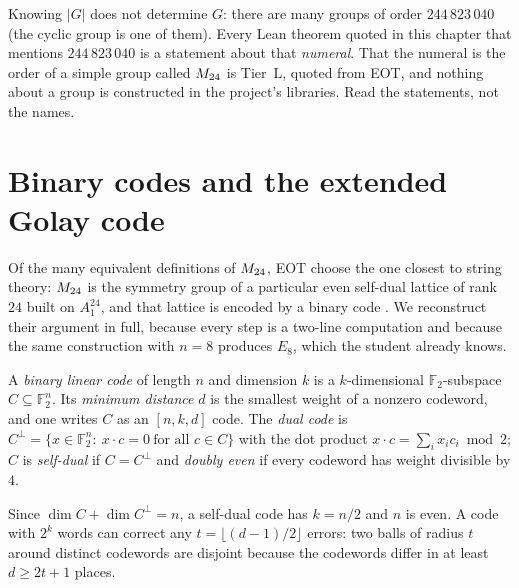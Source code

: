 \begin{pitfallbox}
Knowing $|G|$ does not determine $G$: there are many groups of order $244\,823\,040$ (the
cyclic group is one of them). Every Lean theorem quoted in this chapter that mentions
$244\,823\,040$ is a statement about that \emph{numeral}. That the numeral is the order of a
simple group called $M_{24}$ is Tier~L, quoted from EOT, and nothing about a group is
constructed in the project's libraries. Read the statements, not the names.
\end{pitfallbox}

\section{Binary codes and the extended Golay code}\label{sec:m24:golay}

Of the many equivalent definitions of $M_{24}$, EOT choose the one closest to string theory:
$M_{24}$ is the symmetry group of a particular even self-dual lattice of rank $24$ built on
$A_1^{24}$, and that lattice is encoded by a binary code .
We reconstruct their argument in full, because every step is a two-line computation and
because the same construction with $n=8$ produces $E_8$, which the student already knows.

\begin{definition}\label{def:m24:code}
A \emph{binary linear code} of length $n$ and dimension $k$ is a
$k$-dimensional $\mathbb F_2$-subspace $C\subseteq\mathbb F_2^n$. Its \emph{minimum
distance} $d$ is the smallest weight of a nonzero codeword, and one
writes $C$ as an $[n,k,d]$ code. The \emph{dual code} is
$C^\perp=\{x\in\mathbb F_2^n:\ x\cdot c=0\ \text{for all }c\in C\}$ with the dot product
$x\cdot c=\sum_ix_ic_i\bmod2$; $C$ is \emph{self-dual} if $C=C^\perp$ and \emph{doubly even}
if every codeword has weight divisible by $4$.
\end{definition}

Since $\dim C+\dim C^\perp=n$, a self-dual code has $k=n/2$ and $n$ is even. A code with
$2^k$ words can correct any $t=\lfloor(d-1)/2\rfloor$ errors: two balls of radius $t$ around
distinct codewords are disjoint because the codewords differ in at least $d\ge2t+1$ places.

